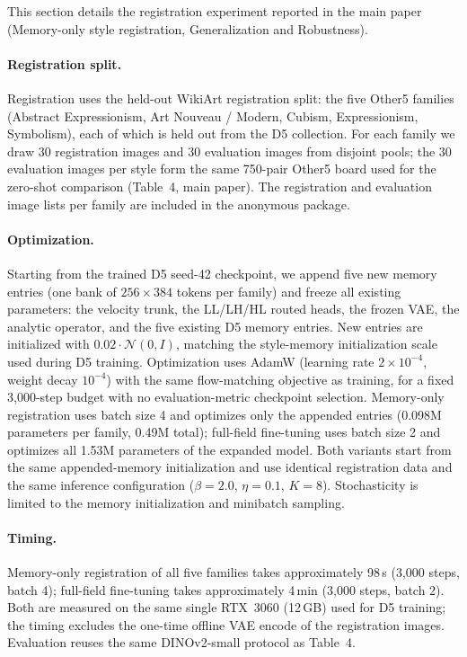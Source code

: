 \documentclass[letterpaper]{article}
\begin{document}
This section details the registration experiment reported in the main paper
(Memory-only style registration, Generalization and Robustness).

\paragraph{Registration split.}
Registration uses the held-out WikiArt registration split: the five Other5 families
(Abstract Expressionism, Art Nouveau / Modern, Cubism, Expressionism, Symbolism), each of
which is held out from the D5 collection. For each family we draw 30 registration images and
30 evaluation images from disjoint pools; the 30 evaluation images per style form the same
750-pair Other5 board used for the zero-shot comparison (Table~4, main paper). The
registration and evaluation image lists per family are included in the anonymous package.

\paragraph{Optimization.}
Starting from the trained D5 seed-42 checkpoint, we append five new memory entries (one bank
of $256\times384$ tokens per family) and freeze all existing parameters: the velocity trunk,
the LL/LH/HL routed heads, the frozen VAE, the analytic operator, and the five existing D5
memory entries. New entries are initialized with $0.02\cdot\mathcal N(0,I)$, matching the
style-memory initialization scale used during D5 training. Optimization uses AdamW
(learning rate $2\times10^{-4}$, weight decay $10^{-4}$) with the same flow-matching objective
as training, for a fixed 3{,}000-step budget with no evaluation-metric checkpoint selection.
Memory-only registration uses batch size 4 and optimizes only the appended entries (0.098M
parameters per family, 0.49M total); full-field fine-tuning uses batch size 2 and optimizes
all 1.53M parameters of the expanded model. Both variants start from the same appended-memory
initialization and use identical registration data and the same inference configuration
($\beta{=}2.0$, $\eta{=}0.1$, $K{=}8$). Stochasticity is limited to the memory initialization
and minibatch sampling.

\paragraph{Timing.}
Memory-only registration of all five families takes approximately 98\,s
(3{,}000 steps, batch 4); full-field fine-tuning takes approximately 4\,min (3{,}000 steps,
batch 2). Both are measured on the same single RTX~3060 (12\,GB) used for D5 training; the
timing excludes the one-time offline VAE encode of the registration images. Evaluation reuses
the same DINOv2-small protocol as Table~4.
\end{document}
